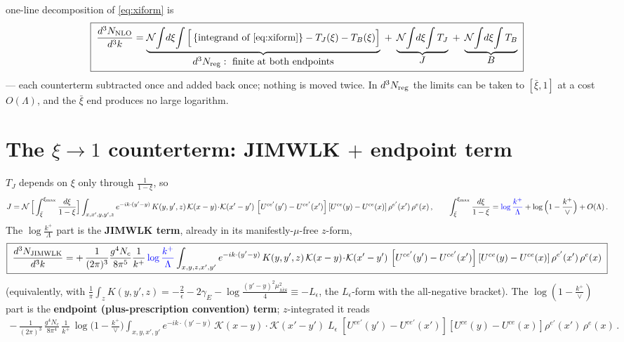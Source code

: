 \documentclass[9pt]{article}
\newcommand{\Leps}{L_{\epsilon}}
\newcommand{\KK}{\mathcal K(x-y)\!\cdot\!\mathcal K(x'-y')}
\newcommand{\Wyy}{\left[U^{ce'}(y') - U^{ce'}(x')\right] \left[U^{ce}(y) - U^{ce}(x)\right] \rho^{e'}(x')\, \rho^{e}(x)}
\begin{document}
one-line decomposition of \eqref{eq:xiform} is
\begin{align}\label{eq:split}
\boxed{\;\frac{d^{3}N_{\rm NLO}}{d^{3}k}
=\underbrace{\mathcal N\!\int\! d\xi\!\int\Big[\,\{\text{integrand of \eqref{eq:xiform}}\}-T_{J}(\xi)-T_{B}(\xi)\Big]}_{\textstyle d^{3}N_{\rm reg}:\ \text{finite at both endpoints}}
\;+\;\underbrace{\mathcal N\!\int\! d\xi\!\int T_{J}}_{\textstyle J}
\;+\;\underbrace{\mathcal N\!\int\! d\xi\!\int T_{B}}_{\textstyle B}\;}
\end{align}
--- each counterterm subtracted once and added back once; nothing is moved twice. In
$d^{3}N_{\rm reg}$ the limits can be taken to $[\bar\xi,1]$ at a cost $O(\Lambda)$, and the
$\bar\xi$ end produces no large logarithm.

\section{The $\xi\to1$ counterterm: JIMWLK $+$ endpoint term}
$T_{J}$ depends on $\xi$ only through $\frac{1}{1-\xi}$, so
\begin{align}
J=\mathcal N\,\Big[\int_{\bar\xi}^{\xi_{\max}}\frac{d\xi}{1-\xi}\Big]
\int_{x,x',y,y',z} e^{-ik\cdot(y'-y)}\,K(y,y',z)\,\KK\,\Wyy\,,\qquad
\int_{\bar\xi}^{\xi_{\max}}\frac{d\xi}{1-\xi}
={\color{blue}\log\frac{k^{+}}{\Lambda}}+\log\Big(1-\frac{k^{+}}{\vee}\Big)+O(\Lambda)\,.
\end{align}
The $\log\frac{k^{+}}{\Lambda}$ part is the \textbf{JIMWLK term}, already in its
manifestly-$\mu$-free $z$-form,
\begin{align}\label{eq:jimwlk}
\boxed{\;\frac{d^{3}N_{\rm JIMWLK}}{d^{3}k}
=+\,\frac{1}{(2\pi)^{3}}\frac{g^{4}N_{c}}{8\pi^{5}}\frac{1}{k^{+}}\,{\color{blue}\log\frac{k^{+}}{\Lambda}}
\int_{x,y,z,x',y'}e^{-ik\cdot(y'-y)}\,K(y,y',z)\,\KK\,\Wyy\;}
\end{align}
(equivalently, with $\frac{1}{\pi}\int_{z}K(y,y',z)=-\frac{2}{\epsilon}-2\gamma_{E}
-\log\frac{(y'-y)^{2}\mu^{2}_{\overline{MS}}}{4}\equiv-\Leps$, the $\Leps$-form with the
all-negative bracket). The $\log(1-\frac{k^{+}}{\vee})$ part is the \textbf{endpoint
(plus-prescription convention) term}; $z$-integrated it reads
\begin{align}\label{eq:endpoint}
-\,\frac{1}{(2\pi)^{3}}\,\frac{g^{4}N_{c}}{8\pi^{4}}\,\frac{1}{k^{+}}\,\log\Big(1-\frac{k^{+}}{\vee}\Big)
\int_{x,y,x',y'}e^{-ik\cdot(y'-y)}\,\KK\;\Leps\;\Wyy\,.
\end{align}
\end{document}
